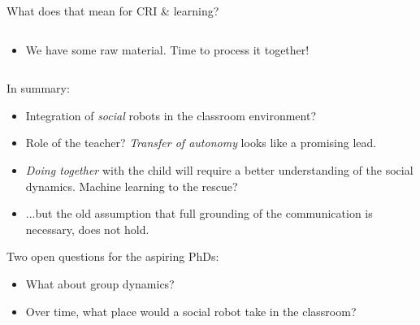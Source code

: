 \documentclass[compress]{beamer}
\begin{document}
\begin{frame}{What does that mean for CRI \& learning?}
\begin{columns}
\begin{column}{0.6\linewidth}
{\begin{itemize}
                \item<+-> We have some raw material. Time to
                    process it together!
            \end{itemize}
        }
%
        \end{column}
    \end{columns}
\end{frame}

{
\begin{frame}[plain]

    {\Large In summary:}

    \begin{itemize}
        \item<+-> Integration of \emph{social} robots in the classroom environment?
        \item<+-> Role of the teacher? \emph{Transfer of autonomy} looks like a
            promising lead.
        \item<+-> \emph{Doing together} with the child will require a better
            understanding of the social dynamics. Machine learning to the
            rescue?
        \item<+-> ...but the old assumption that full grounding of the
            communication is necessary, does not hold.
    \end{itemize}
\end{frame}
}


{
\begin{frame}[plain]

    {\Large Two open questions for the aspiring PhDs:}

    \begin{itemize}
        \item<+-> What about group dynamics?
        \item<+-> Over time, what place would a social robot take in the
            classroom?
    \end{itemize}
\end{frame}
}
\end{document}
